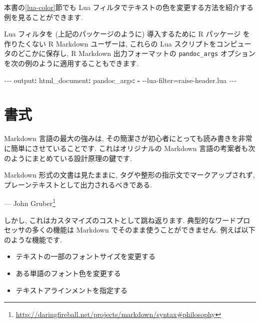 \documentclass[
  11pt,
  lualatex,ja=standard,jafont=noto]{bxjsreport}
\newenvironment{Shaded}{\begin{snugshade}}{\end{snugshade}}
\newcommand{\AttributeTok}[1]{\textcolor[rgb]{0.77,0.63,0.00}{#1}}
\newcommand{\FunctionTok}[1]{\textcolor[rgb]{0.00,0.00,0.00}{#1}}
\newcommand{\KeywordTok}[1]{\textcolor[rgb]{0.13,0.29,0.53}{\textbf{#1}}}
\newcommand{\PreprocessorTok}[1]{\textcolor[rgb]{0.56,0.35,0.01}{\textit{#1}}}
\renewenvironment{quote}{\def\FrameCommand{{\color{quotebarcolor}{\vrule width 3pt}}\hspace{10pt}}\MakeFramed{\advance\hsize-\width\FrameRestore}}{\endMakeFramed}
\renewcommand{\href}[2]{#2\footnote{\url{#1}}}
\begin{document}
本書の\ref{lua-color}節でも Lua フィルタでテキストの色を変更する方法を紹介する例を見ることができます.

Lua フィルタを (上記のパッケージのように) 導入するために R パッケージ を作りたくない R Markdown ユーザーは, これらの Lua スクリプトをコンピュータのどこかに保存し, R Markdown 出力フォーマットの \texttt{pandoc\_args} オプションを次の例のように適用することもできます.

\begin{Shaded}
\begin{Highlighting}[]
\PreprocessorTok{{-}{-}{-}}
\FunctionTok{output}\KeywordTok{:}
\AttributeTok{  }\FunctionTok{html\_document}\KeywordTok{:}
\AttributeTok{    }\FunctionTok{pandoc\_args}\KeywordTok{:}
\AttributeTok{      }\KeywordTok{{-}}\AttributeTok{ {-}{-}lua{-}filter=raise{-}header.lua}
\PreprocessorTok{{-}{-}{-}}
\end{Highlighting}
\end{Shaded}

\hypertarget{formatting}{%
\chapter{書式}\label{formatting}}

Markdown 言語の最大の強みは, その簡潔さが初心者にとっても読み書きを非常に簡単にさせていることです. これはオリジナルの Markdown 言語の考案者も次のようにまとめている設計原理の鍵です.

\begin{quote}
Markdown 形式の文書は見たままに, タグや整形の指示文でマークアップされず, プレーンテキストとして出力されるべきである.

\begin{flushright}
--- \href{http://daringfireball.net/projects/markdown/syntax\#philosophy}{John Gruber}

\end{flushright}
\end{quote}

しかし, これはカスタマイズのコストとして跳ね返ります. 典型的なワードプロセッサの多くの機能は Markdown でそのまま使うことができません. 例えば以下のような機能です.

\begin{itemize}
\item
  テキストの一部のフォントサイズを変更する
\item
  ある単語のフォント色を変更する
\item
  テキストアラインメントを指定する
\end{itemize}
\end{document}
